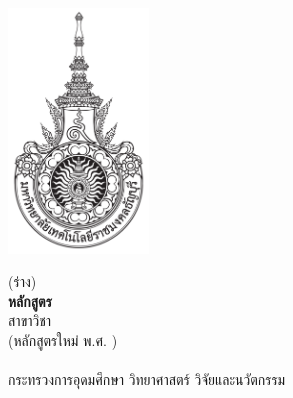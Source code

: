 \pagestyle{empty}
\begin{center}
\includegraphics[height=65mm]{img/rmutt_logo.pdf}
\vspace{15mm}\par
{\LARGE
(ร่าง)\\[2mm]
{\bfseries หลักสูตร\thdegree}\\
สาขาวิชา\thdegreebranch\\[5mm]
(หลักสูตรใหม่ พ.ศ. \bdyear)
}
\vfill
{\LARGE
\faculty\\
\textbf{\university}\\
กระทรวงการอุดมศึกษา วิทยาศาสตร์ วิจัยและนวัตกรรม
}
\end{center}